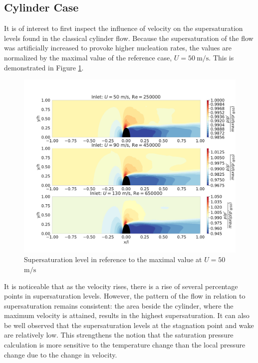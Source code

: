 \documentclass[12pt]{article}
\numberwithin{equation}{section}
\begin{document}
\subsection{Cylinder Case}\label{ss:Cylinder_case}
It is of interest to first inspect the influence of velocity on the supersaturation levels found in the classical cylinder flow. Because the supersaturation of the flow was artificially increased to provoke higher nucleation rates, the values are normalized by the maximal value of the reference case, $U=50\:\mathrm{m/s}$. This is demonstrated in Figure \ref{f:cylinder supersat}.
\begin{figure}[H]
    \centering
    \includegraphics[trim={0 30 0 40},clip,width=1\textwidth]{Figures/supersat_plot_speed_compare.pdf}
    \caption{Supersaturation level in reference to the maximal value at $U=50$ $\mathrm{m/s}$}
    \label{f:cylinder supersat}
\end{figure}
It is noticeable that as the velocity rises, there is a rise of several percentage points in supersaturation levels. However, the pattern of the flow in relation to supersaturation remains consistent: the area beside the cylinder, where the maximum velocity is attained, results in the highest supersaturation. It can also be well observed that the supersaturation levels at the stagnation point and wake are relatively low. This strengthens the notion that the saturation pressure calculation is more sensitive to the temperature change than the local pressure change due to the change in velocity.
\end{document}
